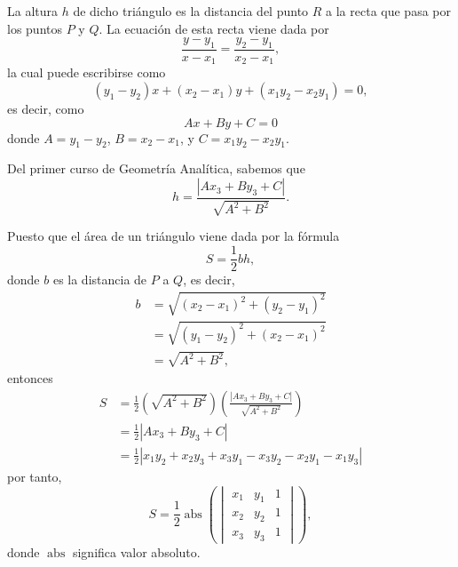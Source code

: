 La altura $h$ de dicho triángulo es la distancia del punto $R$ a la recta que pasa por los puntos $P$ y $Q$. La ecuación de esta recta viene dada por
$$\frac{y-y_1}{x-x_1}=\frac{y_2-y_1}{x_2-x_1},$$
la cual puede escribirse como
$$(y_1-y_2)x+(x_2-x_1)y+(x_1y_2-x_2y_1)=0,$$
es decir, como
$$Ax+By+C=0$$
donde $A=y_1-y_2$, $B=x_2-x_1$, y $C=x_1y_2-x_2y_1$.

Del primer curso de Geometría Analítica, sabemos que
$$h=\frac{\left| Ax_3+By_3+C \right|}{\sqrt{A^2+B^2}}.$$

Puesto que el área de un triángulo viene dada por la fórmula
$$S=\frac{1}{2}bh,$$
donde $b$ es la distancia de $P$ a $Q$, es decir,
\begin{align*}
    b &=\sqrt{(x_2-x_1)^2+(y_2-y_1)^2} \\
    &=\sqrt{(y_1-y_2)^2+(x_2-x_1)^2} \\
    &=\sqrt{A^2+B^2},
\end{align*}\newpage\noindent
entonces
\begin{align*}
    S &=\frac{1}{2} \left( \sqrt{A^2+B^2} \right) \left( \frac{\left| Ax_3+By_3+C \right|}{\sqrt{A^2+B^2}} \right) \\
    &=\frac{1}{2} \left| Ax_3+By_3+C \right| \\
    &=\frac{1}{2} \left| x_1y_2+x_2y_3+x_3y_1-x_3y_2-x_2y_1-x_1y_3 \right|
\end{align*}
por tanto,
$$S=\frac{1}{2} \operatorname{abs} \left(
\begin{vmatrix}
    x_1 & y_1 & 1 \\
    x_2 & y_2 & 1 \\
    x_3 & y_3 & 1
\end{vmatrix} \right),
$$
donde $\operatorname{abs}$ significa valor absoluto.

